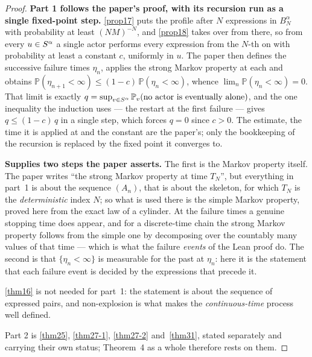 \begin{proof}
  \leanok
  \textbf{Part 1 follows the paper's proof, with its recursion run as a single
  fixed-point step.} \ref{prop17} puts the profile after $N$ expressions in
  $B_N^\alpha$ with probability at least $(NM)^{-N}$, and \ref{prop18} takes
  over from there, so from every $u \in S^\alpha$ a single actor performs every
  expression from the $N$-th on with probability at least a constant $c$,
  uniformly in $u$.  The paper then defines the successive failure times
  $\eta_n$, applies the strong Markov property at each and obtains
  $\mathbb{P}(\eta_{n+1} < \infty) \le (1-c)\,\mathbb{P}(\eta_n < \infty)$,
  whence $\lim_n \mathbb{P}(\eta_n < \infty) = 0$.  That limit is exactly $q =
  \sup_{v \in S^\alpha} \mathbb{P}_v(\text{no actor is eventually alone})$, and
  the one inequality the induction uses --- the restart at the first failure
  --- gives $q \le (1-c)\,q$ in a single step, which forces $q = 0$ since $c >
  0$.  The estimate, the time it is applied at and the constant are the
  paper's; only the bookkeeping of the recursion is replaced by the fixed point
  it converges to.

  \textbf{Supplies two steps the paper asserts.}  The first is the Markov property itself.
  The paper writes ``the strong Markov property at time $T_N$'', but everything in part~1 is
  about the sequence $(A_n)$, that is about the skeleton, for which $T_N$ is the
  \emph{deterministic} index $N$; so what is used there is the simple Markov property, proved
  here from the exact law of a cylinder.  At the failure times a genuine stopping time does
  appear, and for a discrete-time chain the strong Markov property follows from the simple
  one by decomposing over the countably many values of that time --- which is what the
  failure \emph{events} of the Lean proof do.  The second is that $\{\eta_n < \infty\}$ is
  measurable for the past at $\eta_n$: here it is the statement that each failure event is
  decided by the expressions that precede it.

  \ref{thm16} is not needed for part~1: the statement is about the sequence of
  expressed pairs, and non-explosion is what makes the \emph{continuous-time}
  process well defined.

  Part 2 is \ref{thm25}, \ref{thm27-1}, \ref{thm27-2} and~\ref{thm31}, stated separately and
  carrying their own status; Theorem~4 as a whole therefore rests on them.
\end{proof}

